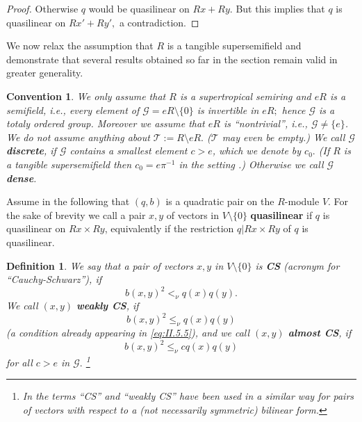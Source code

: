 \documentclass [12pt,a4paper,reqno]{amsart}
\def\00{ \{ 0 \}}
\newtheorem{convention}[thm]{Convention}
\newtheorem{defn}[thm]{Definition}
\begin{document}
\begin{proof} Otherwise $q$ would be quasilinear on $Rx+Ry.$ But
this implies that $q$ is quasilinear on $Rx'+Ry',$ a
contradiction.\end{proof}

We now relax the assumption that $R$ is a tangible supersemifield and demonstrate that several results  obtained so far in the section  remain valid in greater generality.

\begin{convention}\label{conv:II.5.9}
We only assume that $R$ is a supertropical semiring and $eR$ is a semifield, i.e., every element of ${\mathcal G} = eR {\setminus} \00 $  is invertible in $eR;$ hence ${\mathcal G}$ is a totaly ordered group.  Moreover we assume that $eR$  is ``nontrivial'', i.e., ${\mathcal G} \neq \{ e\}$. We do not assume anything about ${\mathcal T} := R {\setminus} eR.$ (${\mathcal T}$ may even be empty.) We call ${\mathcal G}$ \textbf{discrete}, if ${\mathcal G}$ contains a smallest element $c > e$, which we denote by $c_0.$ (If $R$ is a tangible supersemifield then $c_0 = e \pi ^{-1}$ in
the setting \cite[Terminology~7.7]{QF1}.)
Otherwise we call ${\mathcal G}$ \textbf{dense}.
\end{convention}

Assume in the following that $(q,b)$ is a quadratic pair on the $R$-module $V.$
For the sake of brevity   we call a pair $x,y$ of vectors in $V {\setminus} \{ 0 \}$  \textbf{quasilinear} if $q$ is quasilinear on
$Rx \times Ry$, equivalently if the restriction  $q | Rx \times Ry$ of $q$ is quasilinear.

\begin{defn}\label{def:II.5.10}
We say that a pair of vectors $x,y$ in $V {\setminus} \00 $ is \textbf{CS} (acronym for ``Cauchy-Schwarz''), if
\begin{equation}\label{eq:II.5.9}
b(x,y)^2 {<_\nu} q(x)q(y).\end{equation}
We call $(x,y)$ \textbf{weakly CS}, if
\begin{equation}\label{eq:II.5.10}
b(x,y)^2 {\leq_\nu} q(x)q(y)\end{equation}
(a condition already appearing in \eqref{eq:II.5.5}), and we call $(x,y)$
 \textbf{almost CS}, if
\begin{equation}\label{eq:II.5.11}
b(x,y)^2 {\leq_\nu} c q(x)q(y)\end{equation}
for all $c > e$ in ${\mathcal G}.$ \footnote{In \cite[\S5]{IKR-LinAlg2} the terms ``CS'' and ``weakly CS'' have been used in a similar way for pairs of vectors with respect to a (not necessarily symmetric) bilinear form. }
\end{defn}
\end{document}
